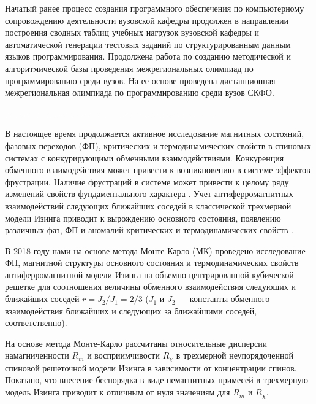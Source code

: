 Начатый ранее процесс создания программного обеспечения по компьютерному сопровождению деятельности вузовской кафедры продолжен в направлении построения сводных таблиц учебных нагрузок вузовской кафедры и автоматической генерации тестовых заданий по структурированным данным языков программирования.
Продолжена работа по созданию методической и алгоритмической базы проведения межрегиональных олимпиад по программированию среди вузов. На ее основе проведена дистанционная межрегиональная олимпиада по программированию среди вузов СКФО.






===============================



В настоящее время продолжается активное исследование магнитных состояний, фазовых переходов (ФП), критических и термодинамических свойств в спиновых системах с конкурирующими обменными взаимодействиями. Конкуренция обменного взаимодействия может привести к возникновению в системе эффектов фрустрации. Наличие фрустраций в системе может привести к целому ряду изменений свойств фундаментального характера \cite{ph1_1,ph1_2,ph1_3}. Учет антиферромагнитных взаимодействий следующих ближайших соседей в классической трехмерной модели Изинга приводит к вырождению основного состояния, появлению различных фаз, ФП и аномалий критических и термодинамических свойств \cite{ph1_4}.

В 2018 году нами на основе метода Монте-Карло (МК) проведено исследование ФП, магнитной структуры основного состояния и термодинамических свойств антиферромагнитной модели Изинга на объемно-центрированной кубической решетке для соотношения величины обменного взаимодействия следующих и ближайших соседей $r=J_2/J_1=2/3$ ($J_1$ и $J_2$ --- константы обменного взаимодействия ближайших и следующих за ближайшими соседей, соответственно).

На основе метода Монте-Карло рассчитаны относительные дисперсии намагниченности  $R_m$ и восприимчивости $R_\chi$  в трехмерной неупорядоченной спиновой решеточной модели Изинга в зависимости от концентрации спинов. Показано, что внесение беспорядка в виде немагнитных примесей в трехмерную модель Изинга приводит к отличным от нуля значениям для $R_m$ и $R_\chi$.


